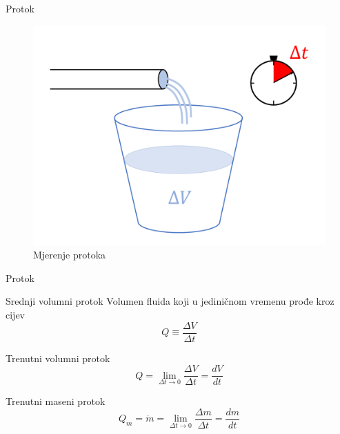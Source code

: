 \documentclass[croatian]{beamer}
\begin{document}
\begin{frame}{Protok}

\begin{figure}
\includegraphics[scale=0.3]{slike/protok}\caption{Mjerenje protoka}
\end{figure}
\end{frame}

\begin{frame}{Protok}

\begin{alertblock}{Srednji volumni protok}
Volumen fluida koji u jediničnom vremenu prođe kroz cijev
\[
Q\equiv\frac{\Delta V}{\Delta t}
\]
\end{alertblock}

\begin{block}{Trenutni volumni protok}
\[
Q=\lim_{\Delta t\rightarrow0}\frac{\Delta V}{\Delta t}=\frac{dV}{dt}
\]
\end{block}

\begin{block}{Trenutni maseni protok}
\[
Q_{m}=\dot{m}=\lim_{\Delta t\rightarrow0}\frac{\Delta m}{\Delta t}=\frac{dm}{dt}
\]
\end{block}
\end{frame}
\end{document}
